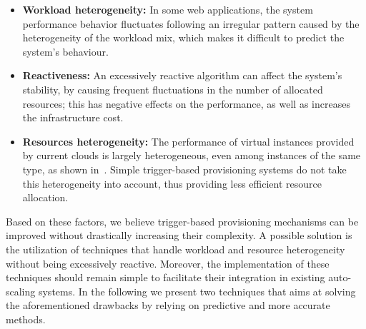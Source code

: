\begin{itemize}
\item  \textbf{Workload heterogeneity:} In some web applications, the 
system performance behavior fluctuates following an irregular pattern 
caused by the heterogeneity of the workload mix, which makes it
difficult to predict the system's behaviour. 


\item \textbf{Reactiveness:} An excessively reactive algorithm can affect 
the system's stability, by causing frequent fluctuations in the number
of allocated resources; this has negative effects on the performance, 
as well as increases the infrastructure cost. 




\item  \textbf{Resources heterogeneity:} The performance of virtual instances 
provided by current clouds is largely heterogeneous, even among
instances of the same type, as shown in~\cite{ec2Performance}.
Simple trigger-based provisioning systems do not take this heterogeneity
into account, thus providing less efficient resource allocation. 


\end{itemize}

Based on these factors, we believe trigger-based provisioning mechanisms can 
be improved without drastically increasing their complexity. A possible 
solution is the utilization of techniques that handle workload and resource
heterogeneity without being excessively reactive. Moreover, the implementation 
of these techniques should remain simple to facilitate their integration in 
existing auto-scaling systems. In the following we present two techniques 
that aims at solving the aforementioned drawbacks by relying on predictive 
and more accurate methods.

